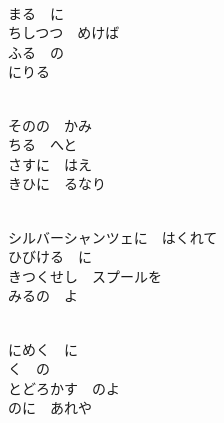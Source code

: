 \documentclass[10pt,b5j]{tarticle} %
\begin{document}
\begin{enumerate}
\begin{minipage}[c]{\blocksize}
        \vspace{\linespace}
        \item~\\
        まる　に\\
        ちしつつ　めけば\\
        ふる　の\\
        にりる　
        
        \vspace{\linespace}
        \item~\\
        そのの　かみ\\
        ちる　へと\\
        さすに　はえ\\
        きひに　るなり
        
        \vspace{\linespace}
        \item~\\
        シルバーシャンツェに　はくれて\\
        ひびける　に\\
        きつくせし　スプールを\\
        みるの　よ
        
        \vspace{\linespace}
        \item~\\
        にめく　に\\
        く　の\\
        とどろかす　のよ\\
        のに　あれや
    
    \end{minipage}
\end{enumerate} %
\end{document}
